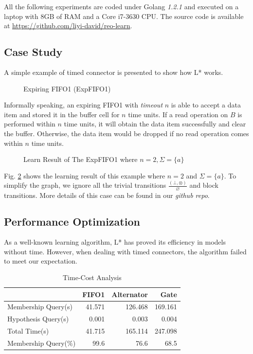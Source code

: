 \documentclass[conference, a4paper]{IEEEtran}
\newcommand{\rnoread}[0]{\otimes}
\newcommand{\rempty}[0]{\varnothing}
\begin{document}
All the following experiments are coded under Golang \emph{1.2.1} and executed on a laptop with 8GB
of RAM and a Core i7-3630 CPU. The source code is available at
\url{https://github.com/liyi-david/reo-learn}.

\subsection{Case Study}
A simple example of timed connector is presented to show how L* works.
\begin{figure}[ht]
  \begin{center}
    
  \end{center}
  \caption{Expiring FIFO1 (ExpFIFO1)}
  \label{fig:expfifo}
\end{figure}

Informally speaking, an expiring FIFO1 with \emph{timeout} $n$ is able to accept a data item
and stored it in the buffer cell for $n$ time units. If a read operation on $B$ is performed within
$n$ time units, it will obtain the data item successfully and clear the buffer. Otherwise, the data
item would be dropped if no read operation comes within $n$ time units.

\begin{figure}[ht]
  \begin{center}
    
  \end{center}
  \caption{Learn Result of The ExpFIFO1 where $n=2,\Sigma=\{a\}$}
  \label{fig:expfifosemantics}
\end{figure}

Fig. \ref{fig:expfifosemantics} shows the learning result of this example where $n=2$ and
$\Sigma=\{a\}$.
To simplify the graph, we ignore all the trivial transitions $\frac{(\bot,\rnoread)}{\rempty}$
and block transitions. More details of this case can be found in our \emph{github repo}.

\subsection{Performance Optimization}
As a well-known learning algorithm, L* has proved its efficiency in models without time.
However, when dealing with timed connectors, the algorithm failed to meet our expectation.

\begin{table}[ht]
  \renewcommand{\arraystretch}{1.3}
  \caption{Time-Cost Analysis}
  \label{tabel:timecost}
  \centering
  \begin{tabular}{l||rrr}
    \hline
    & FIFO1 & Alternator & Gate \\
    \hline\hline
    Membership Query(s) & 41.571 & 126.468 & 169.161 \\
    Hypothesis Query(s) & 0.001 & 0.003 & 0.004 \\
    Total Time(s) & 41.715 & 165.114 & 247.098 \\
    Membership Query(\%) & 99.6 & 76.6 & 68.5 \\
    \hline
  \end{tabular}
\end{table}
\end{document}
